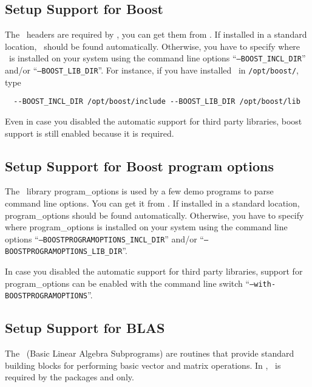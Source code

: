 \subsection{Setup Support for Boost\label{sec:boost-setup}}

The \boost\ headers are required by \cgal, you can get them from
\boostpage. If installed in a standard location, \boost\ should be
found automatically. Otherwise, you have to specify where \boost\ is
installed on your system using the command line options
``\texttt{--BOOST\_INCL\_DIR}'' and/or ``\texttt{--BOOST\_LIB\_DIR}''.
For instance, if you have installed \boost\ in \texttt{/opt/boost/},
type
\begin{verbatim}
  --BOOST_INCL_DIR /opt/boost/include --BOOST_LIB_DIR /opt/boost/lib
\end{verbatim}

Even in case you disabled the automatic support for third party
libraries, boost support is still enabled because it is required.

\subsection{Setup Support for Boost program options\label{sec:boostlibs-setup}}

The \boost\ library program\_options is used by a few demo programs to
parse command line options. You can get it from \boostpage. If
installed in a standard location, program\_options should be found
automatically. Otherwise, you have to specify where program\_options
is installed on your system using the command line options
``\texttt{--BOOSTPROGRAMOPTIONS\_INCL\_DIR}'' and/or
``\texttt{--BOOSTPROGRAMOPTIONS\_LIB\_DIR}''.

In case you disabled the automatic support for third party libraries,
support for program\_options can be enabled with the command line
switch ``\texttt{--with-BOOSTPROGRAMOPTIONS}''.


\subsection{Setup Support for BLAS\label{sec:blas-setup}}

The \blas\ (Basic Linear Algebra Subprograms) are routines that provide
standard building blocks for performing basic vector and matrix operations.
In \cgal, \blas\ is required by the packages
and  only.

